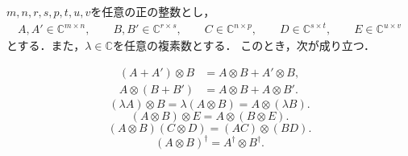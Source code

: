 \begin{theo}[テンソル積の性質]
  \label{theo:matrix-tensor-product-properties}
  $m,n,r,s,p,t,u,v$を任意の正の整数とし，
  \[
    \begin{gathered}
      A,A'\in\mathbb{C}^{m\times n},\qquad
      B,B'\in\mathbb{C}^{r\times s}, \qquad
      C\in\mathbb{C}^{n\times p},\qquad
      D\in\mathbb{C}^{s\times t},\qquad
      E\in\mathbb{C}^{u\times v}
    \end{gathered}
  \]
  とする．また，$\lambda\in\mathbb{C}$を任意の複素数とする．
  このとき，次が成り立つ．

  \begin{equation*}
    \begin{aligned}
      (A+A')\otimes B & =A\otimes B+A'\otimes B, \\
      A\otimes(B+B')  & =A\otimes B+A\otimes B'.
    \end{aligned}
  \end{equation*}
  \begin{equation*}
    (\lambda A)\otimes B
    =\lambda(A\otimes B)
    =A\otimes(\lambda B).
  \end{equation*}
  \begin{equation}
    (A\otimes B)\otimes E=A\otimes(B\otimes E).
    \label{eq:tensor-product-associativity}
  \end{equation}
  \begin{equation}
    (A\otimes B)(C\otimes D)=(AC)\otimes(BD).
    \label{eq:tensor-product-mixed-product}
  \end{equation}
  \begin{equation*}
    (A\otimes B)^\dagger=A^\dagger\otimes B^\dagger.
  \end{equation*}
\end{theo}
